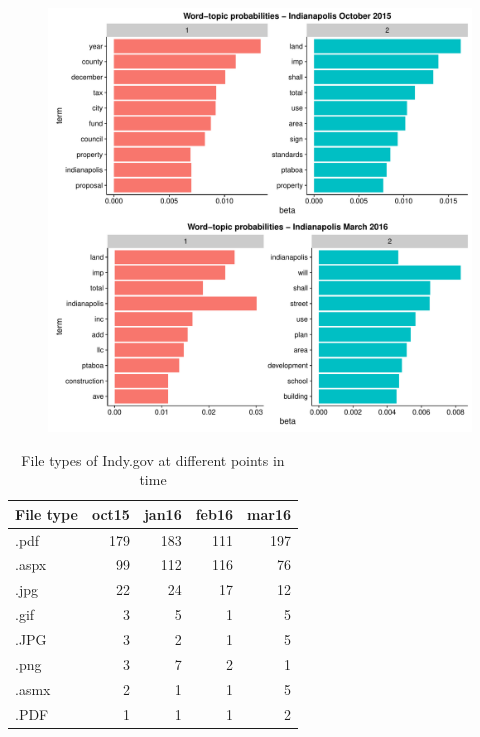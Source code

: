 \documentclass[11pt]{article}
\begin{document}
\begin{figure}[!ht]
	\centering
	\includegraphics[width=\linewidth]{figures/wtpIndy.pdf}
\end{figure}

\begin{table}[ht]
\centering
\begin{tabular}{lrrrr}
  \hline
File type & oct15 & jan16 & feb16 & mar16 \\ 
  \hline
.pdf & 179 & 183 & 111 & 197 \\ 
  .aspx &  99 & 112 & 116 &  76 \\ 
  .jpg &  22 &  24 &  17 &  12 \\ 
  .gif &   3 &   5 &   1 &   5 \\ 
  .JPG &   3 &   2 &   1 &   5 \\ 
  .png &   3 &   7 &   2 &   1 \\ 
  .asmx &   2 &   1 &   1 &   5 \\ 
  .PDF &   1 &   1 &   1 &   2 \\ 
   \hline
\end{tabular}
\caption{File types of Indy.gov at different points in time} 
\end{table}

\newpage



\end{document}
